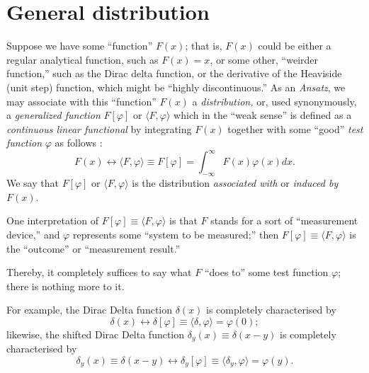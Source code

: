 \section{General distribution}

Suppose we have some ``function'' $F(x)$; that is, $F(x)$ could be either
a regular analytical function, such as $F(x)=x$,
or some other, ``weirder function,'' such as the Dirac delta function,
or the derivative of the Heaviside (unit step) function, which might be ``highly discontinuous.''
As an {\it Ansatz},  we may associate with this ``function'' $F(x)$
a
{\em distribution,}
or, used synonymously,
a
{\em generalized function}
$F[\varphi ]$
or $\langle F , \varphi \rangle $
which
in the ``weak sense'' is  defined as a {\em continuous linear functional}
by integrating $F(x)$ together with some ``good'' {\em test function} $\varphi$
as follows \cite{schwartz}:
\begin{equation}
 F(x) \longleftrightarrow \langle F , \varphi \rangle \equiv F[\varphi] =\int_{-\infty}^{\infty} F(x) \varphi (x) dx.
\end{equation}
We say that $F[\varphi ]$ or $\langle F , \varphi \rangle $ is the distribution {\em associated with}
or {\em induced by}
$F(x)$.


One interpretation of
$F[\varphi ]\equiv \langle F , \varphi \rangle $
is that  $F$ stands for a sort of ``measurement device,''
and $\varphi$ represents some ``system to be measured;''
then
$F[\varphi ]\equiv \langle F , \varphi \rangle $
is the ``outcome'' or ``measurement result.''

Thereby, it completely suffices to say what $F$ ``does to'' some test function $\varphi$; there is nothing more to it.

{
\color{blue}
\bexample
For example, the Dirac Delta function $\delta(x)$ is completely characterised by
$$\delta(x)  \longleftrightarrow \delta [\varphi ]\equiv \langle \delta , \varphi \rangle =\varphi (0);$$
likewise,
the shifted Dirac Delta function $\delta_y(x)\equiv \delta (x-y)$ is completely characterised by
$$\delta_y (x) \equiv \delta(x-y) \longleftrightarrow \delta_y
[\varphi ]\equiv \langle \delta_y , \varphi \rangle =\varphi (y).$$
\eexample
}

